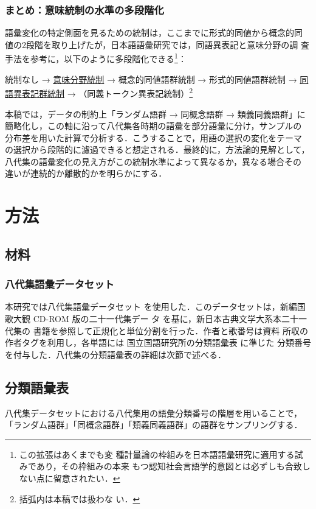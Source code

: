\documentclass[submit]{ipsj}
\begin{document}
\subsubsection{まとめ：意味統制の水準の多段階化}
\label{sec:org6afe0f6}
語彙変化の特定側面を見るための統制は，ここまでに形式的同値から概念的同
値の2段階を取り上げたが，日本語語彙研究では，同語異表記と意味分野の調
査手法を参考に，以下のように多段階化できる\footnote{この拡張はあくまでも変
種計量論の枠組みを日本語語彙研究に適用する試みであり，その枠組みの本来
もつ認知社会言語学的意図とは必ずしも合致しない点に留意されたい．}：

統制なし → \uline{意味分野統制} → 概念的同値語群統制 → 形式的同値語群統制 → \uline{同
語異表記群統制} → （同義トークン異表記統制）\footnote{括弧内は本稿では扱わな
い．}

本稿では，データの制約上「ランダム語群 → 同概念語群 → 類義同義語群」に
簡略化し，この軸に沿って八代集各時期の語彙を部分語彙に分け，サンプルの
分布差を用いた計算で分析する．こうすることで，用語の選択の変化をテーマ
の選択から段階的に濾過できると想定される．最終的に，方法論的見解として，
八代集の語彙変化の見え方がこの統制水準によって異なるか，異なる場合その
違いが連続的か離散的かを明らかにする．
\section{方法\label{org61f9025}}
\label{sec:org1d35579}
\subsection{材料\label{org8d34131}}
\label{sec:orgf820f9c}
\subsubsection{八代集語彙データセット\label{orgb853de5}}
\label{sec:orgfe276c4}
本研究では八代集語彙データセット \cite{Hodoscek2022Developmenta}
を使用した．このデータセットは，新編国歌大観 CD-ROM 版の二十一代集デー
タ\cite{shinhen1996CDROM} を基に，新日本古典文学大系本二十一代集の
書籍を参照して正規化と単位分割を行った．作者と歌番号は資料
\cite{nakamura1999Kokubungaku} 所収の作者タグを利用し，各単語には
国立国語研究所の分類語彙表 \cite{nakano1994Bunruigoihyo} に準じた
分類番号を付与した．八代集の分類語彙表の詳細は次節で述べる．
\subsection{分類語彙表\label{orgf7e08fc}}
\label{sec:org2786212}
八代集データセットにおける八代集用の語彙分類番号の階層を用いることで，
「ランダム語群」「同概念語群」「類義同義語群」の語群をサンプリングする．
\end{document}
